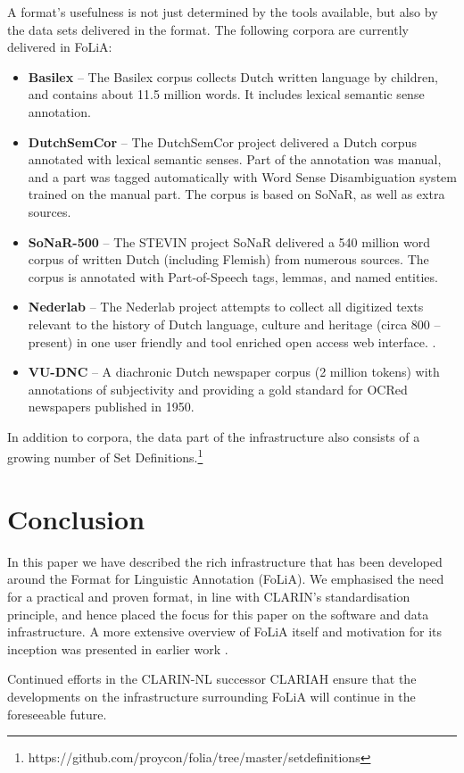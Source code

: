 \documentclass[a4paper,11pt]{article}
\begin{document}
A format's usefulness is not just determined by the tools
available, but also by the data sets delivered in the format.
The following corpora are currently delivered in FoLiA:

\begin{itemize}
    \item \textbf{Basilex} -- The Basilex corpus collects Dutch written language by children,
        and contains about 11.5 million words. It includes lexical semantic sense
        annotation.\cite{BASILEX}
    \item \textbf{DutchSemCor} -- The DutchSemCor project delivered a Dutch corpus annotated
        with lexical semantic senses. Part of the annotation was manual, and a
        part was tagged automatically with Word Sense Disambiguation system trained on
        the manual part. The corpus is based on SoNaR, as well as extra
        sources. \cite{DUTCHSEMCOR}
    \item \textbf{SoNaR-500} --  The STEVIN project SoNaR delivered a 540 million
        word corpus of written Dutch (including Flemish) from numerous sources.
        The corpus is annotated with Part-of-Speech tags, lemmas, and named
        entities. \cite{StevinSONAR2013}
    \item \textbf{Nederlab} -- The Nederlab project attempts to collect all digitized texts relevant to the history of Dutch language, culture and heritage (circa 800 -- present) in one user friendly and tool enriched open access web interface. \cite{Nederlab2016}. 
    \item \textbf{VU-DNC} -- A diachronic Dutch newspaper corpus (2 million tokens) with annotations of
        subjectivity and providing a gold standard for OCRed newspapers published in 1950. \cite{VUDNC}
\end{itemize}

In addition to corpora, the data part of the infrastructure also consists of a
growing number of Set
Definitions.\footnote{https://github.com/proycon/folia/tree/master/setdefinitions}

\section{Conclusion}
\label{sec:conclusion}

In this paper we have described the rich infrastructure that has been developed around
the Format for Linguistic Annotation (FoLiA). We emphasised the need for a
practical and proven format, in line with CLARIN's standardisation principle,
and hence placed the focus for this paper on the software and data
infrastructure. A more extensive overview of FoLiA itself and motivation for its
inception was presented in earlier work \cite{FOLIACLIN2013}.

Continued efforts in the CLARIN-NL successor CLARIAH ensure that the
developments on the infrastructure surrounding FoLiA will continue in the
foreseeable future.


%
  
\end{document}
